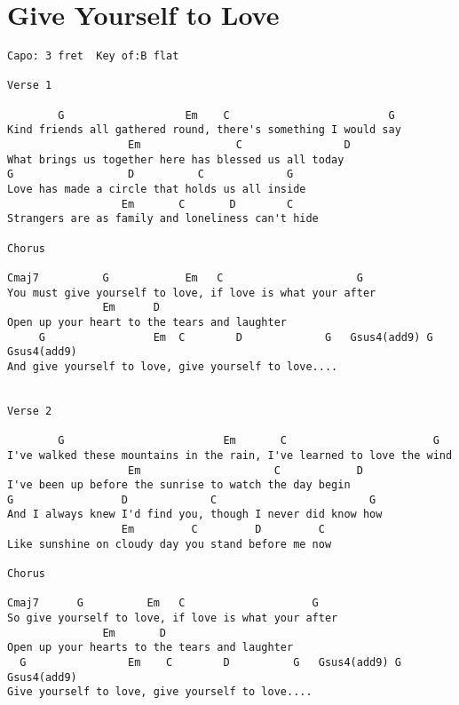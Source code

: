 \documentclass[leqno]{memoir}
\begin{document}
\chapter{Give Yourself to Love}
\begin{verbatim}
Capo: 3 fret  Key of:B flat

Verse 1

        G                   Em    C                         G
Kind friends all gathered round, there's something I would say
                   Em               C                D
What brings us together here has blessed us all today
G                  D          C             G
Love has made a circle that holds us all inside
                  Em       C       D        C      
Strangers are as family and loneliness can't hide

Chorus

Cmaj7          G            Em   C                     G   
You must give yourself to love, if love is what your after
               Em      D
Open up your heart to the tears and laughter
     G                 Em  C        D             G   Gsus4(add9) G  Gsus4(add9)
And give yourself to love, give yourself to love....


Verse 2

        G                         Em       C                       G       
I've walked these mountains in the rain, I've learned to love the wind
                   Em                     C            D
I've been up before the sunrise to watch the day begin
G                 D             C                        G
And I always knew I'd find you, though I never did know how
                  Em         C         D         C
Like sunshine on cloudy day you stand before me now

Chorus

Cmaj7      G          Em   C                    G
So give yourself to love, if love is what your after
               Em       D
Open up your hearts to the tears and laughter
  G                Em    C        D          G   Gsus4(add9) G  Gsus4(add9)
Give yourself to love, give yourself to love....
\end{verbatim}
\newpage
\end{document}
